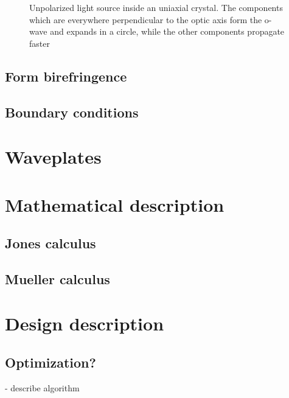 \begin{figure}[h]
    \centering
    
    \caption{Unpolarized light source inside an uniaxial crystal. The components which are everywhere perpendicular to the optic axis form the o-wave and expands in a circle, while the other components propagate faster }
    \label{fig:uniaxial_source}
\end{figure}

\subsection{Form birefringence}

\subsection{Boundary conditions}

\section{Waveplates}
\label{sec:waveplates}

\section{Mathematical description}
\label{sec:mathdescription}

\subsection{Jones calculus}

\subsection{Mueller calculus}
\label{sec:muellercalc}

\section{Design description}
\label{sec:design}

\subsection{Optimization?}
- describe algorithm
